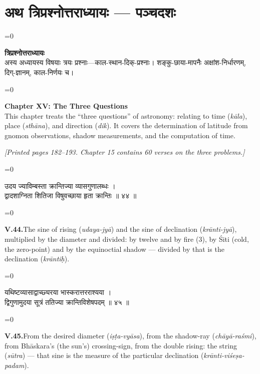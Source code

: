 \documentclass[11pt,a4paper]{article}
\newcommand{\cnote}[1]{\textcolor{notecolor}{\textit{#1}}}
\newcommand{\dev}[1]{{\devanagarifont\color{sktcolor}#1}}
\newcommand{\dsec}[1]{\section*{\dev{#1}}}
\newcommand{\iast}[1]{\textit{#1}}
\newenvironment{paracol}[1]{\begingroup}{\endgroup}
\newcommand{\switchcolumn}[1][]{%
  \ifnum#1=0\relax\else\par\nobreak\vspace{0.5em}\par\nobreak\fi%
}
\begin{document}
\dsec{अथ त्रिप्रश्नोत्तराध्यायः — पञ्चदशः}

\begin{paracol}{2}
\switchcolumn[0]
\dev{%
\textbf{त्रिप्रश्नोत्तराध्यायः}\\[0.2cm]
अस्य अध्यायस्य विषयाः त्रयः प्रश्नाः—काल-स्थान-दिक्-प्रश्नाः।
शङ्कु-छाया-मापनैः अक्षांश-निर्धारणम्, दिग्-ज्ञानम्,
काल-निर्णयः च।
}

\switchcolumn[1]
\textbf{Chapter XV: The Three Questions}\\[0.2cm]
This chapter treats the ``three questions'' of astronomy:
relating to time (\iast{kāla}), place (\iast{sthāna}), and
direction (\iast{dik}). It covers the determination of latitude
from gnomon observations, shadow measurements, and the computation
of time.
\end{paracol}

\vspace{0.3cm}
\cnote{[Printed pages 182–193. Chapter 15 contains 60 verses on the three
problems.]}
\vspace{0.3cm}

\begin{paracol}{2}
\switchcolumn[0]
\dev{%
उदय ज्याविम्बस्ता क्रान्तिज्या व्यासगुणालब्धः ।\\
द्वादशाग्निता शितिजा विषुवच्छाया हृता क्रान्तिः ॥ ४४ ॥
}

\switchcolumn[1]
\textbf{V.44.}\quad The sine of rising (\iast{udaya-jyā}) and the
sine of declination (\iast{krānti-jyā}), multiplied by the diameter
and divided: by twelve and by fire (3), by Śiti (cold, the zero-point)
and by the equinoctial shadow — divided by that is the declination
(\iast{krāntiḥ}).
\end{paracol}

\vspace{0.3cm}

\begin{paracol}{2}
\switchcolumn[0]
\dev{%
यथिष्टव्यासाद्वाच्छ्यरया भास्करात्तरराश्यया ।\\
द्विगुणामुदया सूत्रं ततिज्या क्रान्तिविशेषपदम् ॥ ४५ ॥
}

\switchcolumn[1]
\textbf{V.45.}\quad From the desired diameter (\iast{iṣṭa-vyāsa}), from
the shadow-ray (\iast{chāyā-raśmi}), from Bhāskara's (the sun's)
crossing-sign, from the double rising: the string (\iast{sūtra}) —
that sine is the measure of the particular declination
(\iast{krānti-viśeṣa-padam}).
\end{paracol}
\end{document}
